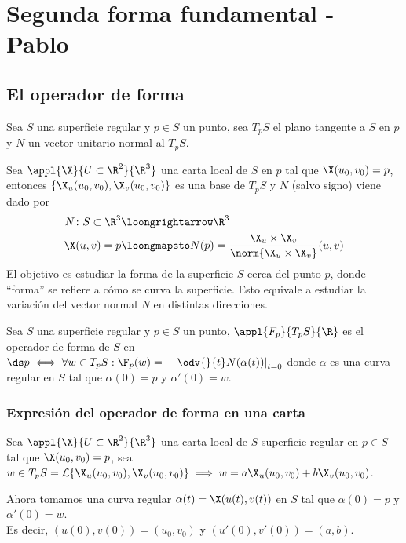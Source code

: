 \section{Segunda forma fundamental - Pablo}
\subsection{El operador de forma}

Sea $S$ una superficie regular y $p \in S$ un punto, sea $T_pS$ el plano tangente a $S$ en $p$ y $N$ un vector unitario normal al $T_pS$.

Sea $\appl{\X}{U\subset\R^2}{\R^3}$ una carta local de $S$ en $p$ tal que $\X(u_0,v_0) = p$,\\
entonces $\{\X_u(u_0, v_0), \X_v(u_0, v_0)\}$ es una base de $T_pS$ y $N$ (salvo signo) viene dado por
\[\begin{aligned}
		N \colon S \subset \R^3 & \loongrightarrow \R^3                                                      \\
		\X(u, v) = p            & \loongmapsto   N(p)=\frac{\X_u \times \X_v}{\norm{\X_u \times \X_v}}(u, v)
	\end{aligned}\]
El objetivo es estudiar la forma de la superficie $S$ cerca del punto $p$, donde ``forma'' se refiere a cómo se curva la superficie. Esto equivale a estudiar la variación del vector normal $N$ en distintas direcciones.

\begin{defn}
	Sea $S$ una superficie regular y $p \in S$ un punto, $\appl{F_p}{T_pS}{\R}$ es el operador de forma de $S$ en $\ds p \iff \forall w \in T_pS : \F_p(w) = -\left.\odv{}{t}N(\alpha(t))\right|_{t=0}$
	donde $\alpha$ es una curva regular en $S$ tal que $\alpha(0) = p$ y $\alpha'(0) = w$.
\end{defn}

\subsubsection{Expresión del operador de forma en una carta}

Sea $\appl{\X}{U\subset\R^2}{\R^3}$ una carta local de $S$ superficie regular en $p\in S$ tal que $\X(u_0,v_0) = p$, sea $w \in T_pS = \mathcal{L}\{\X_u(u_0, v_0), \X_v(u_0, v_0)\} \implies w = a\X_u(u_0, v_0) + b\X_v(u_0, v_0)$.

Ahora tomamos una curva regular $\alpha(t) = \X(u(t), v(t))$ en $S$ tal que $\alpha(0) = p$ y $\alpha'(0) = w$. \\
Es decir, $(u(0), v(0)) = (u_0, v_0)$ y $(u'(0), v'(0)) = (a, b)$.


